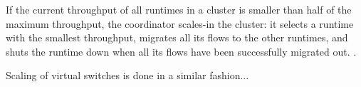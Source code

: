 If the current throughput of all runtimes in a cluster is smaller than half of the maximum throughput, the coordinator scales-in the cluster: it selects a runtime with the smallest throughput, migrates all its flows to the other runtimes, and shuts the runtime down when all its flows have been successfully migrated out. .
 





 Scaling of virtual switches is done in a similar fashion...




